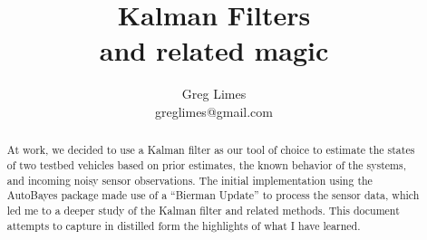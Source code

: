 \documentclass{article}
\title{Kalman Filters\\and related magic}
\author{Greg Limes\\greglimes@gmail.com}
\numberwithin{equation}{section}
\begin{document}
\maketitle

\begin{abstract}
\noindent
At work,
we decided to use a Kalman filter
as our tool of choice
to estimate the states of
two testbed vehicles
based on prior estimates,
the known behavior of the systems,
and incoming noisy sensor observations.
The initial implementation
using the AutoBayes package
made use of a ``Bierman Update''
to process the sensor data,
which led me to a deeper study
of the Kalman filter and related methods.
This document attempts to capture
in distilled form
the highlights of what I have learned.
\end{abstract}

\newpage
\tableofcontents
\newpage

\newpage

\newpage

\newpage

\newpage

\newpage

\newpage

\newpage
\appendix

\newpage

\newpage

\end{document}
